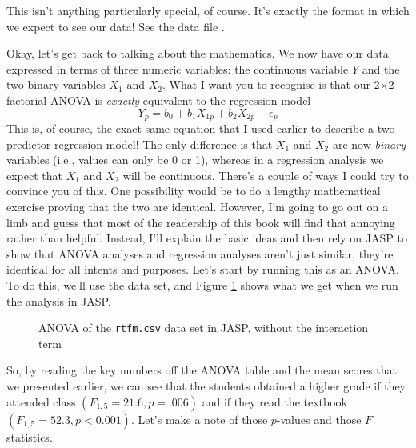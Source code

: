 \noindent
This isn't anything particularly special, of course. It's exactly the format in which we expect to see our data! See the data file . 


Okay, let's get back to talking about the mathematics. We now have our data expressed in terms of three numeric variables: the continuous variable $Y$ and the two binary variables $X_1$ and $X_2$. What I want you to recognise is that our 2$\times$2 factorial ANOVA is {\it exactly} equivalent to the regression model 
$$
Y_{p} = b_0 + b_1 X_{1p} + b_2 X_{2p} + \epsilon_p
$$
This is, of course, the exact same equation that I used earlier to describe a two-predictor regression model! The only difference is that $X_1$ and $X_2$ are now {\it binary} variables (i.e., values can only be 0 or 1), whereas in a regression analysis we expect that $X_1$ and $X_2$ will be continuous.  There's a couple of ways I could try to convince you of this. One possibility would be to do a lengthy mathematical exercise proving that the two are identical. However, I'm going to go out on a limb and guess that most of the readership of this book will find that annoying rather than helpful. Instead, I'll explain the basic ideas and then rely on JASP to show that ANOVA analyses and regression analyses aren't just similar, they're identical for all intents and purposes. Let's start by running this as an ANOVA. To do this, we'll use the  data set, and Figure \ref{fig:factorialanova6} shows what we get when we run the analysis in JASP.

\begin{figure}[!htb]
\begin{center}
\caption{ANOVA of the \texttt{rtfm.csv} data set in JASP, without the interaction term}
\label{fig:factorialanova6}
\HR
\end{center}
\end{figure}

So, by reading the key numbers off the ANOVA table and the mean scores that we presented earlier, we can see that the students obtained a higher grade if they attended class $(F_{1,5} = 21.6, p = .006)$ and if they read the textbook $(F_{1,5} = 52.3, p <0.001)$. Let's make a note of those $p$-values and those $F$ statistics. 

